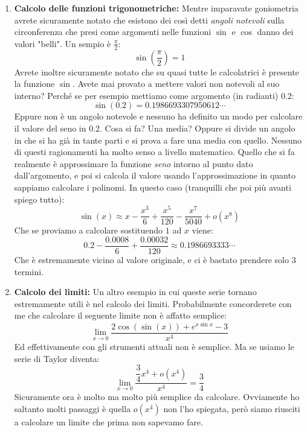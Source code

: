 \begin{enumerate}
	\item \textbf{Calcolo delle funzioni trigonometriche:} Mentre imparavate goniometria avrete sicuramente notato che esistono dei così detti \textit{angoli notevoli} sulla circonferenza che presi come argomenti nelle funzioni $\sin$ e $\cos$ danno dei valori "belli". Un sempio è $\frac{\pi}{2}$:
	\begin{equation*}
		\sin \left(\dfrac{\pi}{2}\right) = 1
	\end{equation*}
	Avrete inoltre sicuramente notato che su quasi tutte le calcolatrici è presente la funzione $\sin$. Avete mai provato a mettere valori non notevoli al suo interno? Perché se per esempio mettiamo come argomento (in radianti) 0.2:
	\begin{equation*}
		\sin(0.2) = 0.1986693307950612\cdots 
	\end{equation*}
	Eppure non è un angolo notevole e nessuno ha definito un modo per calcolare il valore del seno in 0.2. Cosa si fa? Una media? Oppure si divide un angolo in che si ha già in tante parti e si prova a fare una media con quello. Nessuno di questi ragionamenti ha molto senso a livello matematico. Quello che si fa realmente è approssimare la funzione \textit{seno} intorno al punto dato dall'argomento, e poi si calcola il valore usando l'approssimazione in quanto sappiamo calcolare i polinomi. In questo caso (tranquilli che poi più avanti spiego tutto):
	\begin{equation*}
		\sin(x) \approx x - \dfrac{x^3}{6} + \dfrac{x^5}{120} - \dfrac{x^7}{5040} + o(x^8)
	\end{equation*}
	Che se proviamo a calcolare sostituendo $1$ ad $x$ viene:
	\begin{equation*}
		0.2 - \dfrac{0.0008}{6} + \dfrac{0.00032}{120} \approx 0.1986693333 \cdots
	\end{equation*}
	Che è estremamente vicino al valore originale, e ci è bastato prendere solo 3 termini.

	\item \textbf{Calcolo dei limiti:} Un altro esempio in cui queste serie tornano estremamente utili è nel calcolo dei limiti. Probabilmente concorderete con me che calcolare il seguente limite non è affatto semplice:
		\begin{equation*}
			\lim_{x \to 0} \dfrac{2\cos(\sin(x)) + e^{x\sin{x}} - 3}{x^4}
		\end{equation*}
		Ed effettivamente con gli strumenti attuali non è semplice. Ma se usiamo le serie di Taylor diventa:
		\begin{equation*}
			\lim_{x \to 0} \dfrac{\dfrac{3}{4} x^4 + o(x^4)}{x^4} = \dfrac{3}{4}
		\end{equation*}
		Sicuramente ora è molto ma molto più semplice da calcolare. Ovviamente ho saltanto molti passaggi è quella $o(x^4)$ non l'ho spiegata, però siamo riusciti a calcolare un limite che prima non sapevamo fare.

\end{enumerate}

